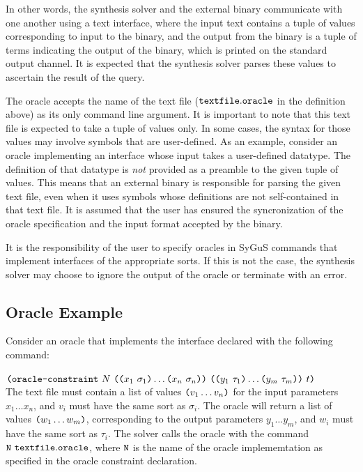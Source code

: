 \documentclass[english,a4paper,10pt]{article}
\begin{document}
In other words, the synthesis solver and the external binary
communicate with one another using a text interface, where the input text contains
a tuple of values corresponding to input to the binary, and the output
from the binary is a tuple of terms indicating the output of the binary,
which is printed on the standard output channel.
It is expected that the synthesis solver parses these values to
ascertain the result of the query.

The oracle accepts the name of the text file
(${\tt textfile.oracle}$ in the definition above)
as its only command line argument.
It is important to note that this text file is expected to take
a tuple of values only.
In some cases, 
the syntax for those values may involve symbols that are user-defined.
As an example, consider an oracle
implementing an interface whose input takes a user-defined datatype.
The definition of that datatype is \emph{not} provided as a preamble
to the given tuple of values.
This means that an external binary is responsible for
parsing the given text file, even when it uses symbols whose definitions
are not self-contained in that text file. 
It is assumed that
the user has ensured the syncronization of the oracle specification
and the input format accepted by the binary.

It is the responsibility of the user to specify oracles in
SyGuS commands that implement interfaces of the appropriate sorts.
If this is not the case, the synthesis solver may choose to ignore the output
of the oracle or terminate with an error.

\subsection{Oracle Example}

\noindent Consider an oracle that implements the interface declared with the following command:\\\\
$\texttt{(}\texttt{oracle-constraint}\mbox{ } N \mbox{ }
\texttt{(}\texttt{(}x_1\mbox{ }\sigma_1\texttt{)} \ldots \texttt{(}x_n\mbox{ }\sigma_n\texttt{)}\texttt{)}\mbox{ }
\texttt{(}\texttt{(}y_{1}\mbox{ }\tau_{1}\texttt{)} \ldots \texttt{(}y_{m}\mbox{ }\tau_{m}\texttt{)}\texttt{)}  \mbox{ } t\texttt{)}$ \\

The text file must contain a list of values $\texttt{(}v_1 \ldots v_n\texttt{)}$ for the input parameters $x_1 \ldots x_n$, and $v_i$ must have the same sort as $\sigma_i$.
The oracle will return a list of values $\texttt{(}w_{1} \ldots w_{m}\texttt{)}$, corresponding to the output parameters $y_{1} \ldots y_{m}$, and $w_i$ must have the same sort as $\tau_i$.
%
The solver calls the oracle with the command ${\tt N \,\,textfile.oracle}$, where ${\tt N}$ is the name of the oracle implememtation as specified in the oracle constraint declaration.
\end{document}
